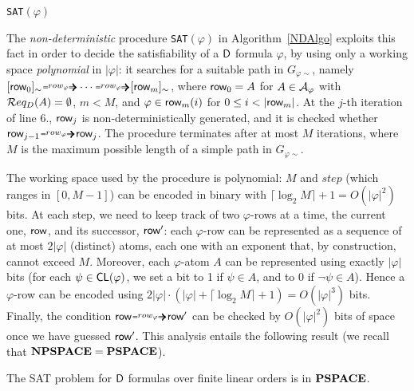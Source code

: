 \begin{algorithm}[b]
\begin{algorithmic}[1]
\caption{\texttt{SAT}$(\varphi)$}\label{NDAlgo}
%
    \EndIf
    \EndIf
%
\end{algorithmic}
\end{algorithm}

The \emph{non-deterministic} procedure \texttt{SAT}$(\varphi)$ in Algorithm~\ref{NDAlgo} exploits this fact in order to decide the satisfiability 
of a $\mathsf{D}$ formula $\varphi$, by using only a working space \emph{polynomial} in $|\varphi|$: it searches for a suitable path in $G_{\varphi \sim}$, namely  $[\row_0]_\sim \rownext \cdots \allowbreak \rownext [\row_{m}]_\sim$, where $\text{{\sffamily row}}_0 =A$ for $A\in \mathcal{A}_{\varphi}$ with  $\mathcal{R} eq_D(A)=\emptyset$, $m< M$, and $\varphi\in \text{{\sffamily row}}_m(i)$ for $0\leq i<|\row_m|$. At the $j$-th iteration of line 6., $\text{{\sffamily row}}_{j}$ is non-deterministically generated, and it is checked whether $\row_{j-1}\rownext\row_{j}$.
The procedure terminates after at most $M$ iterations, where $M$ is the maximum possible length of a simple path in $G_{\varphi\sim}$.

The working space used by the procedure is polynomial:
$M$
and $step$ (which ranges in $[0,M-1]$) can be encoded 
in binary with $\lceil \log_2 M \rceil +1=O(|\varphi|^2)$ bits.  
At each step, we need to keep track of two $\varphi$-rows at a time, the current one, $\text{{\sffamily row}}$, and its successor, $\text{{\sffamily row}}'$: each $\varphi$-row can be represented as a sequence of at most $2|\varphi|$ (distinct) atoms,
each one with an exponent that, by construction, cannot exceed $M$. 
Moreover, each $\varphi$-atom $A$ can be represented using exactly $|\varphi|$ bits (for each
$\psi \in \mathsf{CL}(\varphi)$, we set a bit to 1 if $\psi\in A$, and to 0 if $\neg\psi\in A$). Hence a $\varphi$-row can be encoded using $2|\varphi|\cdot(|\varphi|+\lceil \log_2 M \rceil +1)=O(|\varphi|^3)$ bits. 
%
Finally, the condition $\row \rownext \row'$ can be checked
by $O(|\varphi|^2)$ bits of space once we have guessed $\text{{\sffamily row}}'$. 
This analysis entails the following result (we recall that $\textbf{NPSPACE}=\textbf{PSPACE}$).
%
\begin{theorem}\label{thm:pspace}
The SAT problem for $\mathsf{D}$ formulas over finite linear orders is in $\textbf{PSPACE}$.
\end{theorem} 


